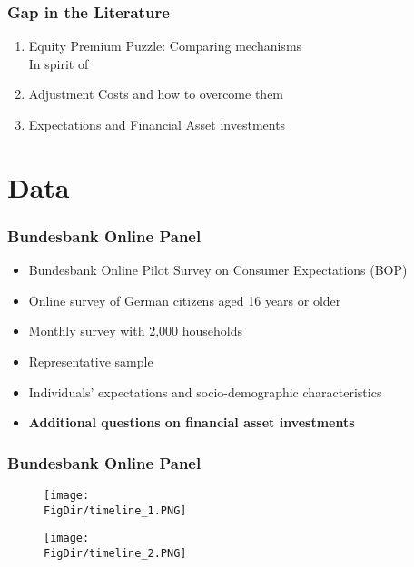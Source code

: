 \documentclass[pdflatex]{beamer}
\begin{document}
\begin{frame}
	\frametitle{Gap in the Literature}
	\begin{enumerate}
		\item Equity Premium Puzzle: Comparing mechanisms\\
		\small{In spirit of \cite{choi_2020, bender_et_al_2019}}
		\vspace{2em}
		\item Adjustment Costs and how to overcome them\\
		\small{\cite{bonaparte_et_al_2012adjustment}}
		\vspace{2em}
		\item Expectations and Financial Asset investments\\
		\small{\cite{giglio_et_al_2019five, manski_2018survey}}
	\end{enumerate}
\end{frame}



\section{Data}

\begin{frame}
	\frametitle{Bundesbank Online Panel}
	\begin{itemize}
		\setlength\itemsep{0.8em}
		\item Bundesbank Online Pilot Survey on Consumer Expectations (BOP) 
		\item Online survey of German citizens aged 16 years or older
		\item Monthly survey with 2,000 households 
		\item Representative sample
		\item Individuals’ expectations and socio-demographic characteristics
		\pause
		\item \textbf{Additional questions on financial asset investments}
	\end{itemize} 
\end{frame}

\begin{frame}[label = Timeline]
	\frametitle{Bundesbank Online Panel}
	\vspace{-1.7em}
	\begin{figure}
		\centering
		\texttt{[image: \\FigDir/timeline\_1.PNG]}
	\end{figure}
	\pause
	\vspace{-1.5em}
	\begin{figure}
		\centering
		\texttt{[image: \\FigDir/timeline\_2.PNG]}
	\end{figure}
\end{frame}
\end{document}
